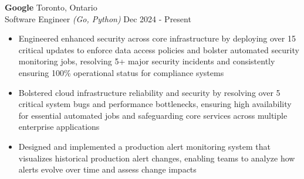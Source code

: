 \documentclass[a4paper]{article}
\begin{document}
\textbf{Google} 
\hfill Toronto, Ontario \\
Software Engineer  {\sl (Go, Python)} \hfill Dec 2024 - Present \\
\vspace{-1mm}
\begin{itemize} \itemsep 1pt
     \item Engineered enhanced security across core infrastructure by deploying over 15 critical updates to enforce data access policies and bolster automated security monitoring jobs, resolving 5+ major security incidents and consistently ensuring 100\% operational status for compliance systems
     \item Bolstered cloud infrastructure reliability and security by resolving over 5 critical system bugs and performance bottlenecks, ensuring high availability for essential automated jobs and safeguarding core services across multiple enterprise applications
     \item Designed and implemented a production alert monitoring system that visualizes historical production alert changes, enabling teams to analyze how alerts evolve over time and assess change impacts

 \end{itemize}
\vspace{-1.5mm}
\end{document}
